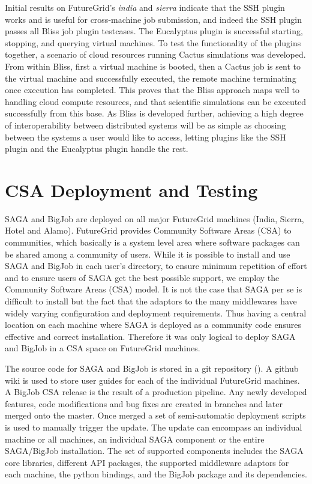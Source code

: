 \documentclass[]{paper}
\begin{document}
Initial results on FutureGrid's \textit{india} and \textit{sierra} indicate that the
SSH plugin works and is useful for cross-machine
job submission, and indeed the SSH plugin passes all Bliss job plugin testcases.
The Eucalyptus plugin is successful starting, stopping, and querying virtual machines.
To test the functionality of the plugins together, a scenario of cloud resources running
Cactus simulations was developed.  From within Bliss, first a virtual machine is booted, 
then a Cactus job is sent to the virtual machine and successfully executed,
 the remote machine terminating
once execution has completed.  This proves that the Bliss approach maps well to handling
cloud compute resources, and that scientific simulations can be executed successfully from this
base.  As Bliss is developed further, achieving a high degree of interoperability
between distributed systems will be as simple as choosing between the systems a user would like
to access, letting plugins like the SSH plugin and the Eucalyptus plugin handle the rest.

\section{CSA Deployment and Testing}
SAGA and BigJob are deployed on all major FutureGrid machines (India,
Sierra, Hotel and Alamo).  FutureGrid provides Community Software
Areas (CSA) to communities, which basically is a system level area
where software packages can be shared among a community of users.
While it is possible to install and use SAGA and BigJob in each user's
directory, to ensure minimum repetition of effort and to ensure users
of SAGA get the best possible support, we employ the Community
Software Areas (CSA) model.  It is not the case that SAGA per se is
difficult to install but the fact that the adaptors to the many
middlewares have widely varying configuration and deployment
requirements.  Thus having a central location on each machine where
SAGA is deployed as a community code ensures effective and correct
installation.  Therefore it was only logical to deploy SAGA and BigJob
in a CSA space on FutureGrid machines.

The source code for SAGA and BigJob is stored in a git repository
(\cite{bigjob_web}). A github wiki is used to store user guides for
each of the individual FutureGrid machines. A BigJob CSA release is
the result of a production pipeline. Any newly developed features,
code modifications and bug fixes are created in branches and later
merged onto the master. Once merged a set of semi-automatic deployment
scripts is used to manually trigger the update. The update can
encompass an individual machine or all machines, an individual SAGA
component or the entire SAGA/BigJob installation. The set of supported
components includes the SAGA core libraries, different API packages,
the supported middleware adaptors for each machine, the python
bindings, and the BigJob package and its dependencies.
\end{document}
